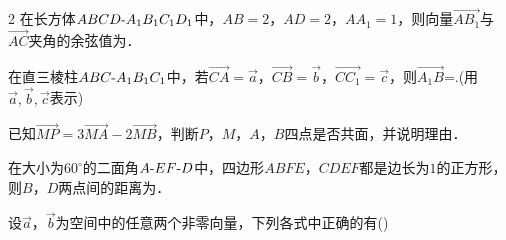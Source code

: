 \documentclass[fontset=none]{ctexart}
\begin{document}
\begin{multicols}{2}
 在长方体\(ABCD\text{-}\penalty100 A_1B_1C_1D_1\)中，\(AB=2\)，\(AD=2\)，\(AA_1=1\)，则向量\(\overrightarrow{AB_1}\)与\(\overrightarrow{AC}\)夹角的余弦值为\kongbai{}．
\begin{ansblock}[练-课时01-5]
\end{ansblock}

 在直三棱柱\(ABC\text{-}\penalty100 A_{1}B_{1}C_{1}\)中，若\(\overrightarrow{CA} = \overrightarrow{a}\)，\(\overrightarrow{CB} = \overrightarrow{b}\)，\(\overrightarrow{CC_{1}} = \overrightarrow{c}\)，则\nobreak\(\overrightarrow{A_{1}B}\)=\kongbai{}.(用\(\overrightarrow{a},\overrightarrow{b},\overrightarrow{c}\)表示)
\begin{ansblock}[练-课时01-6]
\end{ansblock}

 已知\(\overrightarrow{MP}=3\overrightarrow{MA}-2\overrightarrow{MB}\)，判断\(P\)，\(M\)，\(A\)，\(B\)四点是否共面，并说明理由．
\xiexwei{20mm}
\begin{ansblock}[练-课时01-7]
\end{ansblock}

 在大小为\(60^\circ\)的二面角\(A\text{-}\penalty100 EF\text{-}\penalty100 D\)中，四边形\(ABFE\)，\(CDEF\)都是边长为\(1\)的正方形，则\nobreak\(B\)，\(D\)两点间的距离为\kongbai{}．
\begin{ansblock}[练-课时01-8]
\end{ansblock}

\duoxuan{} 设\(\overrightarrow{a}\)，\(\overrightarrow{b}\)为空间中的任意两个非零向量，下列各式中正确的有(\kongwei)
\begin{ansblock}[练-课时01-9]
\end{ansblock}


\end{multicols}
\end{document}
